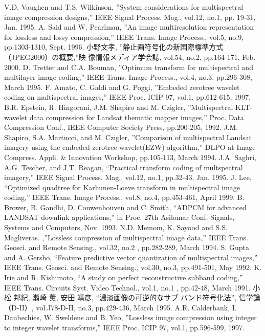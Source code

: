 

\renewcommand{\bibname}{参考文献}
\begin{thebibliography}{99}
V.D. Vaughen and T.S. Wilkinson, ''System considerations for
	multispectral image compression designs,'' IEEE Signal
	Process. Mag., vol.12, no.1, pp. 19-31, Jan. 1995.
A. Said and W. Pearlman, ''An image multiresolution representation
	for lossless and lossy compression,'' IEEE Trans. Image
	Process., vol.5, no.9, pp.1303-1310, Sept. 1996.
小野文孝, ''静止画符号化の新国際標準方式（JPEG2000）の概要,''映
	像情報メディア学会誌, vol.54, no.2, pp.164-171, Feb. 2000.
D. Tretter and C.A. Bouman, ''Optimum transform for multispectral
	and multilayer image coding,'' IEEE Trans. Image Process., vol.4, no.3, pp.296-308,
	March 1995.
F. Amato, C. Galdi and G. Poggi, ''Embeded zerotree wavelet
	coding on multispectral images,'' IEEE Proc. ICIP 97, vol.1, pp.612-615, 1997.
B.R. Epstein, R. Hingorani, J.M. Shapiro and
	M. Czigler, ''Multispectral KLT-wavelet data compression for
	Landsat thematic mapper images,'' Proc. Data Compression
	Conf., IEEE Computer Society Press, pp.200-205, 1992.
J.M. Shapiro, S.A. Martucci, and M. Czigler, ''Comparison of
	multispectral Landsat imagery using the embeded zerotree
	wavelet(EZW) algorithm,'' DLPO at Image Compress. Appli. \&
	Innovation Workshop, pp.105-113, March 1994. 
J.A. Saghri, A.G. Tescher, and J.T. Reagan, ``Practical transform
	coding of multspectral imagery,'' IEEE Signal Process. Mag.,
	vol.12, no.1, pp.32-43, Jan. 1995.
J. Lee, ``Optimized quadtree for Karhunen-Loeve transform in
	multispectral image coding,'' IEEE Trans. Image Process., vol.8, no.4,
	pp.453-461, April 1999.
B. Brower, B. Gandhi, D. Couwenhouven and C. Smith, ``ADPCM
	for advanced LANDSAT downlink applications,'' in Proc. 27th
	Asilomar Conf. Signals, Systems and Computers, Nov. 1993. 
N.D. Memom, K. Sayood and S.S. Magliveras. ,''Lossless compression
	of multispectral image data,'' IEEE Trans. Geosci. and
	Remote Sensing., vol.32, no.2 , pp.282-289, March 1994.
S. Gupta and A. Gersho, ``Feature predictive vector quantization
	of multispectral images,'' IEEE Trans. Geosci. and
	Remote Sensing., vol.30, no.3, pp.491-501, May 1992.
K. Irie and R. Kishimoto, ``A study on perfect reconstructive
	subband coding,'' IEEE Trans. Circuits Syst. Video Technol.,
	vol.1, no.1 , pp.42-48, March 1991.
 小松 邦紀, 瀬崎 薫, 安田 靖彦, ``濃淡画像の可逆的なサブ
	バンド符号化法'', 信学論（D-II）, vol.J78-D-II, no.3,
	pp.429-436, March 1995.
A.R. Calderbank, I. Daubechies, W. Sweldens and B. Yeo, ''Lossless
	image compression using integer to integer wavelet transforms,'' 
	IEEE Proc. ICIP 97, vol.1, pp.596-599, 1997.


\end{thebibliography}
